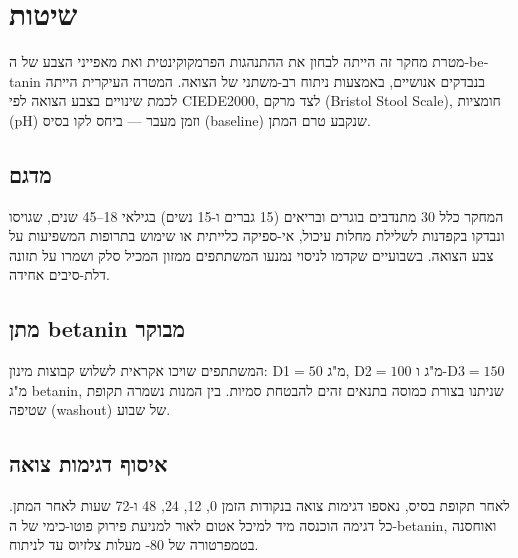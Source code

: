 \section{\texthebrew{שיטות}}

\begin{hebrew}מטרת מחקר זה הייתה לבחון את ההתנהגות הפרמקוקינטית ואת מאפייני הצבע של ה-\textenglish{betanin} בנבדקים אנושיים, באמצעות ניתוח רב-משתני של הצואה. המטרה העיקרית הייתה לכמת שינויים בצבע הצואה לפי \textenglish{CIEDE2000}, לצד מרקם (\textenglish{Bristol Stool Scale}), חומציות (\textenglish{pH}) וזמן מעבר — ביחס לקו בסיס (\textenglish{baseline}) שנקבע טרם המתן.\end{hebrew}

\subsection{\texthebrew{מדגם}}

\begin{hebrew}המחקר כלל 30 מתנדבים בוגרים ובריאים (15 גברים ו-15 נשים) בגילאי 18--45 שנים, שגויסו ונבדקו בקפדנות לשלילת מחלות עיכול, אי-ספיקה כלייתית או שימוש בתרופות המשפיעות על צבע הצואה. בשבועיים שקדמו לניסוי נמנעו המשתתפים ממזון המכיל סלק ושמרו על תזונה דלת-סיבים אחידה.\end{hebrew}

\subsection{\texthebrew{מתן \textenglish{betanin} מבוקר}}

\begin{hebrew}המשתתפים שויכו אקראית לשלוש קבוצות מינון: \textenglish{D1}$=50$ מ"ג, \textenglish{D2}$=100$ מ"ג ו-\textenglish{D3}$=150$ מ"ג \textenglish{betanin}, שניתנו בצורת כמוסה בתנאים זהים להבטחת סמיות. בין המנות נשמרה תקופת שטיפה (\textenglish{washout}) של שבוע.\end{hebrew}

\subsection{\texthebrew{איסוף דגימות צואה}}

\begin{hebrew}לאחר תקופת בסיס, נאספו דגימות צואה בנקודות הזמן 0, 12, 24, 48 ו-72 שעות לאחר המתן. כל דגימה הוכנסה מיד למיכל אטום לאור למניעת פירוק פוטו-כימי של ה-\textenglish{betanin}, ואוחסנה בטמפרטורה של 80- מעלות צלזיוס עד לניתוח.\end{hebrew}

